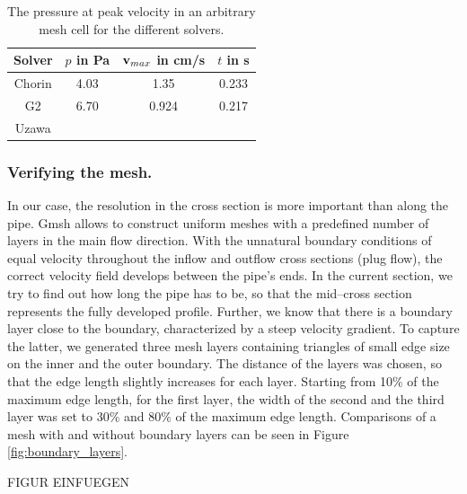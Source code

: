 \begin{table}\begin{center}
    \begin{tabular}{ | c | c | c | c |}
    \hline
    Solver & $p$ in Pa & $\mathbf{v}_{max}$ in cm/s  & $t$ in s \\ \hline\hline
	Chorin & 4.03 & 1.35 & 0.233 	\\ \hline
	G2	&	6.70 & 0.924 & 0.217	\\ \hline
	Uzawa	&	& 		&\\	
    \hline
    \end{tabular}
	\label{tab:solvers}
	\caption{The pressure at peak velocity in an arbitrary mesh cell for the different solvers.}
\end{center}\end{table}


\subsubsection{Verifying the mesh.}
In our case, the resolution in the cross section is more important than along the pipe. Gmsh allows to construct uniform meshes with a predefined number of layers in the main flow direction. With the unnatural boundary conditions of equal velocity throughout the inflow and outflow cross sections (plug flow), the correct velocity field develops between the pipe's ends. In the current section, we try to find out how long the pipe has to be, so that the mid--cross section represents the fully developed profile. Further, we know that there is a boundary layer close to the boundary, characterized by a steep velocity gradient. To capture the latter, we generated three mesh layers containing triangles of small edge size on the inner and the outer boundary. The distance of the layers was chosen, so that the edge length slightly increases for each layer. Starting from 10\% of the maximum edge length, for the first layer, the width of the second and the third layer was set to 30\% and 80\% of the maximum edge length. Comparisons of a mesh with and without boundary layers can be seen in Figure \ref{fig:boundary_layers}.


FIGUR EINFUEGEN



